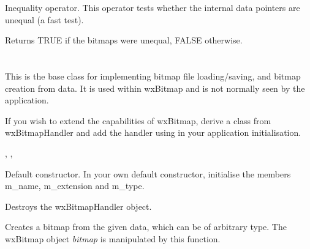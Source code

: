 Inequality operator. This operator tests whether the internal data pointers are
unequal (a fast test).




Returns TRUE if the bitmaps were unequal, FALSE otherwise.

\section{}\label{wxbitmaphandler}


This is the base class for implementing bitmap file loading/saving, and bitmap creation from data.
It is used within wxBitmap and is not normally seen by the application.

If you wish to extend the capabilities of wxBitmap, derive a class from wxBitmapHandler
and add the handler using  in your
application initialisation.




, , 


\label{wxbitmaphandlerconstr}


Default constructor. In your own default constructor, initialise the members
m\_name, m\_extension and m\_type.



Destroys the wxBitmapHandler object.



Creates a bitmap from the given data, which can be of arbitrary type. The wxBitmap object {\it bitmap} is
manipulated by this function.

